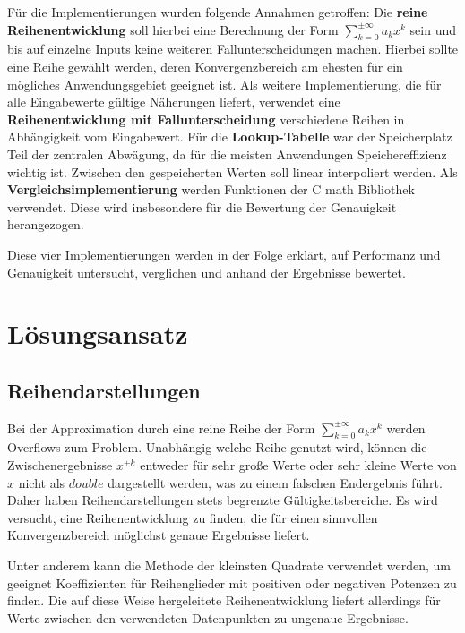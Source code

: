 \documentclass[course=erap] {aspdoc}
\begin{document}
    Für die Implementierungen wurden folgende Annahmen getroffen:
    Die \textbf{reine Reihenentwicklung} soll hierbei eine Berechnung der Form $\sum_{k=0}^{\pm\infty} a_k x^k$ sein und bis auf einzelne Inputs keine weiteren Fallunterscheidungen machen.
    Hierbei sollte eine Reihe gewählt werden, deren Konvergenzbereich am ehesten für ein mögliches Anwendungsgebiet geeignet ist.
    Als weitere Implementierung, die für alle Eingabewerte gültige Näherungen liefert, verwendet eine \textbf{Reihenentwicklung mit Fallunterscheidung} verschiedene Reihen in Abhängigkeit vom Eingabewert.
    Für die \textbf{Lookup-Tabelle} war der Speicherplatz Teil der zentralen Abwägung, da für die meisten Anwendungen Speichereffizienz wichtig ist.
    Zwischen den gespeicherten Werten soll linear interpoliert werden.
    Als \textbf{Vergleichsimplementierung} werden Funktionen der C math Bibliothek verwendet.
    Diese wird insbesondere für die Bewertung der Genauigkeit herangezogen.

    Diese vier Implementierungen werden in der Folge erklärt, auf Performanz und Genauigkeit untersucht, verglichen und anhand der Ergebnisse bewertet.


    \section{Lösungsansatz}\label{sec:losungsansatz}

    \subsection{Reihendarstellungen}\label{subsec:reihendarstellung}

    Bei der Approximation durch eine reine Reihe der Form $\sum_{k=0}^{\pm\infty} a_k x^k$ werden Overflows zum Problem.
    Unabhängig welche Reihe genutzt wird, können die Zwischenergebnisse $x^{\pm k}$ entweder für sehr große Werte oder sehr kleine Werte von $x$ nicht als $double$ dargestellt werden, was zu einem falschen Endergebnis führt.
    Daher haben Reihendarstellungen stets begrenzte Gültigkeitsbereiche.
    Es wird versucht, eine Reihenentwicklung zu finden, die für einen sinnvollen Konvergenzbereich möglichst genaue Ergebnisse liefert.

    Unter anderem kann die Methode der kleinsten Quadrate verwendet werden, um geeignet Koeffizienten für Reihenglieder mit positiven oder negativen Potenzen zu finden.
    Die auf diese Weise hergeleitete Reihenentwicklung liefert allerdings für Werte zwischen den verwendeten Datenpunkten zu ungenaue Ergebnisse.
\end{document}
